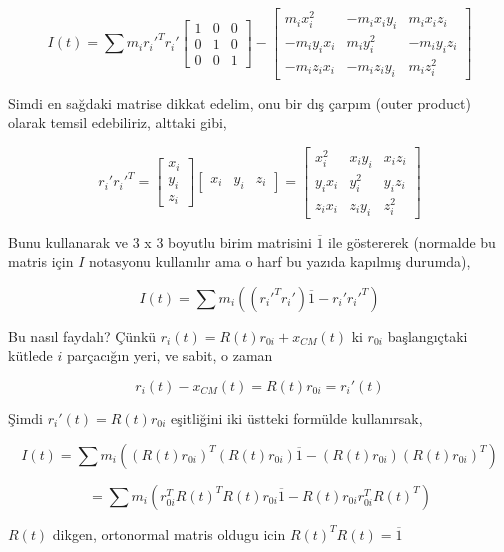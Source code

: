\documentclass[12pt,fleqn]{article}\usepackage{../../common}
\begin{document}
$$
I(t) = \sum
m_i r_i'^T r_i' \left[\begin{array}{ccc}
1 & 0 & 0 \\ 
0 & 1 & 0 \\ 
0 & 0 & 1 
\end{array}\right] -
\left[\begin{array}{ccc}
m_i x_i^2 & -m_i x_i y_i & m_i x_i z_i \\
-m_i y_i x_i & m_i y_i^2 & -m_i y_i z_i \\
-m_i z_i x_i & -m_i z_i y_i & m_i z_i^2
\end{array}\right]
$$

Simdi en sağdaki matrise dikkat edelim, onu bir dış çarpım (outer product)
olarak temsil edebiliriz, alttaki gibi,

$$
r_i' r_i'^T = \left[\begin{array}{c}
x_i \\ y_i \\ z_i
\end{array}\right]
\left[\begin{array}{ccc}
x_i & y_i & z_i
\end{array}\right] =
\left[\begin{array}{ccc}
x_i^2 &  x_i y_i &  x_i z_i \\
y_i x_i & y_i^2 & y_i z_i \\
z_i x_i & z_i y_i & z_i^2
\end{array}\right]
$$

Bunu kullanarak ve 3 x 3 boyutlu birim matrisini $\overline{1}$ ile göstererek
(normalde bu matris için $I$ notasyonu kullanılır ama o harf bu yazıda
kapılmış durumda),

$$
I(t) = \sum m_i ((r_i'^T r_i') \overline{1} - r_i' r_i'^T)
$$

Bu nasıl faydalı? Çünkü $r_i(t) = R(t) r_{0i} + x_{CM}(t)$ ki $r_{0i}$
başlangıçtaki kütlede $i$ parçacığın yeri, ve sabit, o zaman

$$
r_i(t) - x_{CM}(t) = R(t) r_{0i} = r_i'(t)
$$

Şimdi $r_i'(t) = R(t) r_{0i}$ eşitliğini iki üstteki formülde kullanırsak,

$$
I(t) = \sum
m_i ( (R(t) r_{0i})^T  (R(t) r_{0i})  \overline{1} -  (R(t) r_{0i})  (R(t) r_{0i})^T  )
$$

$$
= \sum
m_i ( r_{0i}^T R(t)^T R(t) r_{0i} \overline{1} -  R(t) r_{0i} r_{0i}^T R(t)^T )
$$

$R(t)$ dikgen, ortonormal matris oldugu icin $R(t)^TR(t) = \overline{1}$
\end{document}
